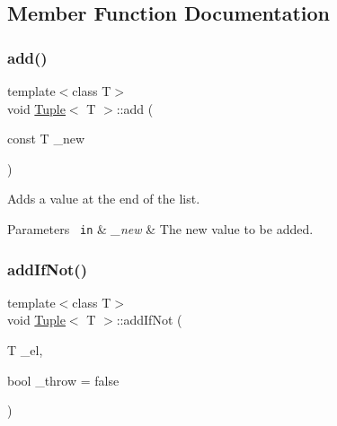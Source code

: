 \subsection{Member Function Documentation}
\mbox{\label{class_tuple_a5d3ee2809d790543195a6e2075aef7d0}} 
\subsubsection{\texorpdfstring{add()}{add()}}
{\footnotesize\ttfamily template$<$class T$>$ \\
void \mbox{\hyperlink{class_tuple}{Tuple}}$<$ T $>$\+::add (\begin{DoxyParamCaption}\item[{const T}]{\+\_\+new }\end{DoxyParamCaption})\hspace{0.3cm}{\ttfamily [inline]}}



Adds a value at the end of the list. 


\begin{DoxyParams}[1]{Parameters}
\mbox{\texttt{ in}}  & {\em \+\_\+new} & The new value to be added. \\
\hline
\end{DoxyParams}
\mbox{\label{class_tuple_ac7699d6813e11c18f436098e9f76ebf0}} 
\subsubsection{\texorpdfstring{addIfNot()}{addIfNot()}}
{\footnotesize\ttfamily template$<$class T$>$ \\
void \mbox{\hyperlink{class_tuple}{Tuple}}$<$ T $>$\+::add\+If\+Not (\begin{DoxyParamCaption}\item[{T}]{\+\_\+el,  }\item[{bool}]{\+\_\+throw = {\ttfamily false} }\end{DoxyParamCaption})\hspace{0.3cm}{\ttfamily [inline]}}

\mbox{\label{class_tuple_a1173bba1687b01721f9e4e4c73de0d2a}} 
